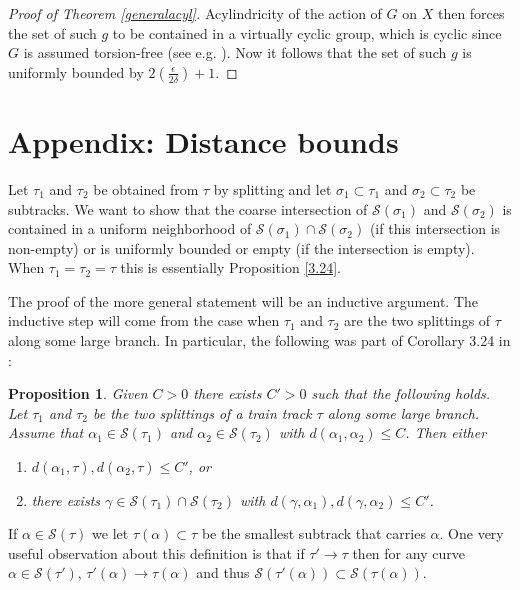 \documentclass[11pt]{article}
\newtheorem{prop}[thm]{Proposition}
\theoremstyle{remark}
\def\S{{\mathcal S}}
\begin{document}
\begin{proof}[Proof of Theorem \ref{generalacyl}]
  Acylindricity of the action of $G$ on $X$ then forces the
  set of such $g$ to be contained in a virtually cyclic group,
  which is cyclic since $G$ is assumed torsion-free
  (see e.g. \cite[Proposition 6]{BF}). Now
  it follows that the set of such $g$ is
  uniformly bounded by $2\left(\frac\epsilon{2\delta}\right)+1$.
\end{proof}


\setcounter{section}{0}
\setcounter{thm}{0}
\renewcommand{\thesection}{\Alph{section}}

\section{Appendix: Distance bounds}
\label{sec:appendix}
Let $\tau_1$ and $\tau_2$ be obtained from $\tau$ by splitting and let $\sigma_1\subset \tau_1$ and $\sigma_2\subset \tau_2$ be subtracks. We want to show that the coarse intersection of $\S(\sigma_1)$ and $\S(\sigma_2)$ is contained in a uniform neighborhood of $\S(\sigma_1) \cap \S(\sigma_2)$ (if this intersection is non-empty) or is uniformly bounded or empty (if the intersection is empty). When $\tau_1 = \tau_2 = \tau$ this is essentially Proposition \ref{3.24}.

The proof of the more general statement will be an inductive argument. The inductive step will come from the case when $\tau_1$ and $\tau_2$ are the two splittings of $\tau$ along some large branch.
In particular, the following was part of Corollary 3.24 in \cite{BB}:
\begin{prop}\label{3.24b}
Given $C>0$ there exists $C'>0$ such that the following holds.
Let $\tau_1$ and $\tau_2$ be the two splittings of a train track $\tau$ along some large branch. Assume that $\alpha_1 \in \S(\tau_1)$ and $\alpha_2 \in \S(\tau_2)$ with $d(\alpha_1, \alpha_2) \le C$. Then either
\begin{enumerate}[(1)]
\item $d(\alpha_1, \tau), d(\alpha_2, \tau) \le C'$, or

\item there exists $\gamma \in \S(\tau_1) \cap \S(\tau_2)$ with $d(\gamma, \alpha_1),  d(\gamma, \alpha_2) \le C'$.
\end{enumerate}
\end{prop}

If $\alpha \in \S(\tau)$ we let $\tau(\alpha) \subset \tau$ be the smallest subtrack that carries $\alpha$. One very useful observation about this definition is that if $\tau'\to\tau$ then for any curve $\alpha \in \S(\tau')$, $\tau'(\alpha)\to\tau(\alpha)$ and thus $\S(\tau'(\alpha)) \subset \S(\tau(\alpha))$.
\end{document}
